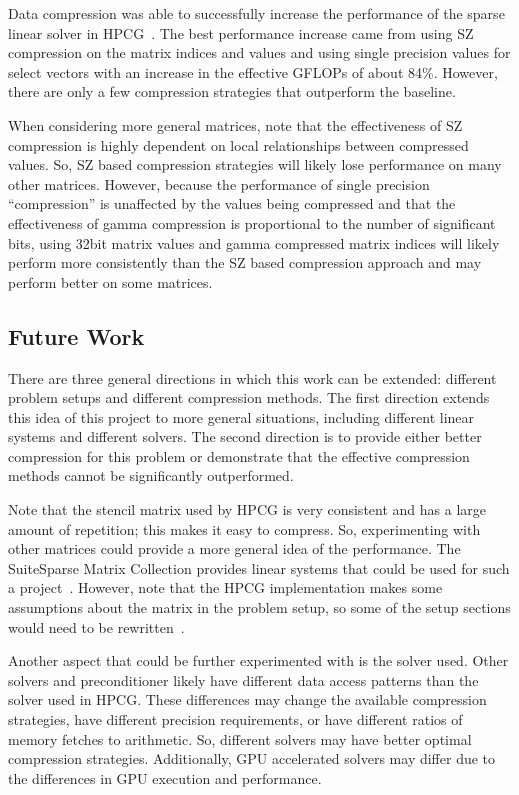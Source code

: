 Data compression was able to successfully increase the performance of the sparse linear solver in HPCG~\cite{Dongarra:2015:HPCG}.
The best performance increase came from using SZ compression on the matrix indices and values and using single precision values for select vectors with an increase in the effective GFLOPs of about 84\%.
However, there are only a few compression strategies that outperform the baseline.

When considering more general matrices, note that the effectiveness of SZ compression is highly dependent on local relationships between compressed values.
So, SZ based compression strategies will likely lose performance on many other matrices.
However, because the performance of single precision ``compression'' is unaffected by the values being compressed and that the effectiveness of gamma compression is proportional to the number of significant bits, using 32bit matrix values and gamma compressed matrix indices will likely perform more consistently than the SZ based compression approach and may perform better on some matrices.

\subsection{Future Work}
There are three general directions in which this work can be extended: different problem setups and different compression methods.
The first direction extends this idea of this project to more general situations, including different linear systems and different solvers.
The second direction is to provide either better compression for this problem or demonstrate that the effective compression methods cannot be significantly outperformed.

Note that the stencil matrix used by HPCG is very consistent and has a large amount of repetition; this makes it easy to compress.
So, experimenting with other matrices could provide a more general idea of the performance.
The SuiteSparse Matrix Collection provides linear systems that could be used for such a project~\cite{Davis:2011:FloridaMatrixCollection}.
However, note that the HPCG implementation makes some assumptions about the matrix in the problem setup, so some of the setup sections would need to be rewritten~\cite{Dongarra:2015:HPCG}.

Another aspect that could be further experimented with is the solver used.
Other solvers and preconditioner likely have different data access patterns than the solver used in HPCG.
These differences may change the available compression strategies, have different precision requirements, or have different ratios of memory fetches to arithmetic.
So, different solvers may have better optimal compression strategies.
Additionally, GPU accelerated solvers may differ due to the differences in GPU execution and performance.

